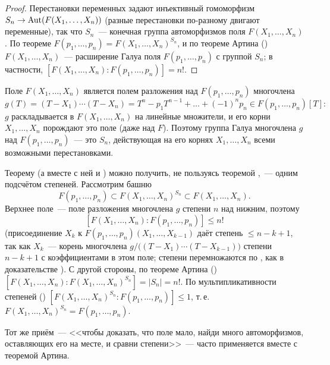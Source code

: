 \begin{proof}
Перестановки переменных задают инъективный гомоморфизм $S_n\to\operatorname{Aut}(F(X_1,\dots,X_n))$ (разные перестановки по-разному
двигают переменные), так что $S_n$~--- конечная группа автоморфизмов поля $F(X_1,\dots,X_n)$. По теореме 
$F(p_1,\dots,p_n)=F(X_1,\dots,X_n)^{S_n}$, и по теореме Артина () $F(X_1,\dots,X_n)$~--- расширение Галуа поля
$F(p_1,\dots,p_n)$ с группой $S_n$; в частности, $[F(X_1,\dots,X_n):F(p_1,\dots,p_n)]=n!$.
\end{proof}

Поле $F(X_1,\dots,X_n)$ является полем разложения над $F(p_1,\dots,p_n)$ многочлена
\[
g(T)=(T-X_1)\cdots(T-X_n)=T^n-p_1T^{n-1}+\dots+(-1)^np_n\in F(p_1,\dots,p_n)[T]:
\]
$g$ раскладывается в $F(X_1,\dots,X_n)$ на линейные множители, и его корни $X_1,\dots,X_n$ порождают это поле (даже над
$F$). Поэтому группа Галуа многочлена $g$ над $F(p_1,\dots,p_n)$~--- это $S_n$, действующая на его корнях
$X_1,\dots,X_n$ всеми возможными перестановками.

\begin{remark}
Теорему  (а вместе с ней и ) можно получить, не пользуясь теоремой ,~--- одним подсчётом степеней. Рассмотрим
башню
\[
F(p_1,\dots,p_n)\subset F(X_1,\dots,X_n)^{S_n}\subset F(X_1,\dots,X_n).
\]
Верхнее поле~--- поле разложения многочлена $g$ степени $n$ над нижним, поэтому
\[
[F(X_1,\dots,X_n):F(p_1,\dots,p_n)]\le n!
\]
(присоединение $X_k$ к $F(p_1,\dots,p_n)(X_1,\dots,X_{k-1})$ даёт степень $\le n-k+1$, так как $X_k$~--- корень
многочлена $g/\bigl((T-X_1)\cdots(T-X_{k-1})\bigr)$ степени $n-k+1$ с коэффициентами в этом поле; степени
перемножаются по , как в доказательстве ). С другой стороны, по теореме Артина ()
$[F(X_1,\dots,X_n):F(X_1,\dots,X_n)^{S_n}]=|S_n|=n!$. По мультипликативности
степеней () $[F(X_1,\dots,X_n)^{S_n}:F(p_1,\dots,p_n)]\le1$, т.\,е.\ $F(X_1,\dots,X_n)^{S_n}=F(p_1,\dots,p_n)$.
\medskip
\begin{keepfig}
\begin{center}
\end{center}
\end{keepfig}
Тот же приём~--- <<чтобы доказать, что поле мало, найди много автоморфизмов, оставляющих его на месте, и сравни степени>>~---
часто применяется вместе с теоремой Артина.
\end{remark}

